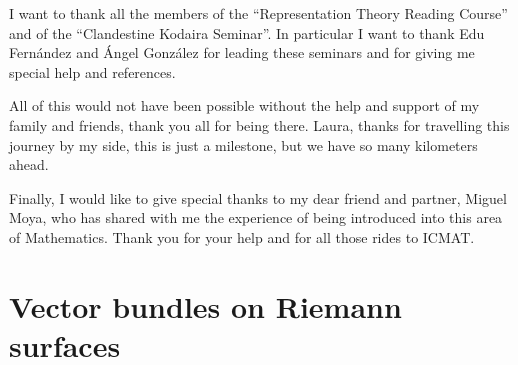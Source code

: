 \documentclass[12pt,a4paper]{book}
\theoremstyle{definition} \newtheorem{defn}[thm]{Definition}
\theoremstyle{definition} \newtheorem{ejemplo}[thm]{Example}
\theoremstyle{remark} \newtheorem{rem}[thm]{Remark}
\begin{document}
I want to thank all the members of the ``Representation Theory Reading Course'' and of the ``Clandestine Kodaira Seminar''. In particular I want to thank Edu Fernández and Ángel González for leading these seminars and for giving me special help and references.

All of this would not have been possible without the help and support of my family and friends, thank you all for being there. Laura, thanks for travelling this journey by my side, this is just a milestone, but we have so many kilometers ahead. 

Finally, I would like to give special thanks to my dear friend and partner, Miguel Moya, who has shared with me the experience of being introduced into this area of Mathematics. Thank you for your help and for all those rides to ICMAT.

\newpage\null\thispagestyle{empty}

\chapter{Vector bundles on Riemann surfaces}
\end{document}
